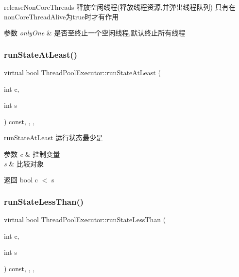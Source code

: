 release\+Non\+Core\+Threads 释放空闲线程(释放线程资源,并弹出线程队列) 只有在non\+Core\+Thread\+Alive为true时才有作用 


\begin{DoxyParams}{参数}
{\em only\+One} & 是否至终止一个空闲线程,默认终止所有线程 \\
\hline
\end{DoxyParams}
\mbox{\label{classThreadPoolExecutor_a44ee48ed44faa12fc6373074e9059e4e}} 
\subsubsection{\texorpdfstring{run\+State\+At\+Least()}{runStateAtLeast()}}
{\footnotesize\ttfamily virtual bool Thread\+Pool\+Executor\+::run\+State\+At\+Least (\begin{DoxyParamCaption}\item[{int}]{c,  }\item[{int}]{s }\end{DoxyParamCaption}) const\hspace{0.3cm}{\ttfamily [inline]}, {\ttfamily [final]}, {\ttfamily [protected]}, {\ttfamily [virtual]}}



run\+State\+At\+Least 运行状态最少是 


\begin{DoxyParams}{参数}
{\em c} & 控制变量 \\
\hline
{\em s} & 比较对象\\
\hline
\end{DoxyParams}
\begin{DoxyReturn}{返回}
bool c $<$ s 
\end{DoxyReturn}
\mbox{\label{classThreadPoolExecutor_aa12a3efb879080453fb7abc486585698}} 
\subsubsection{\texorpdfstring{run\+State\+Less\+Than()}{runStateLessThan()}}
{\footnotesize\ttfamily virtual bool Thread\+Pool\+Executor\+::run\+State\+Less\+Than (\begin{DoxyParamCaption}\item[{int}]{c,  }\item[{int}]{s }\end{DoxyParamCaption}) const\hspace{0.3cm}{\ttfamily [inline]}, {\ttfamily [final]}, {\ttfamily [protected]}, {\ttfamily [virtual]}}



